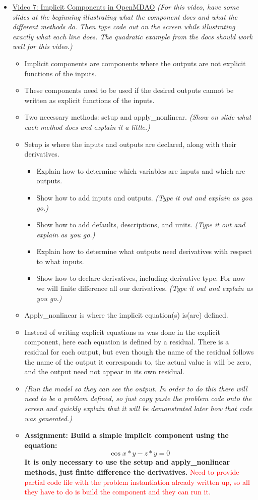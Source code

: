 \documentclass[12pt, letterpaper]{article}
\begin{document}
\begin{itemize}
	\item \underline{Video 7: Implicit Components in OpenMDAO} \textit{(For this video, have some slides at the beginning illustrating what the 				component does and what the different methods do. Then type code out on the screen while illustrating exactly what each line does. The 					quadratic example from the docs should work well for this video.)}
		\begin{itemize}
			\item Implicit components are components where the outputs are not explicit functions of the inputs.
			\item These components need to be used if the desired outputs cannot be written as explicit functions of the inputs.
			\item Two necessary methods: setup and apply\_nonlinear. \textit{(Show on slide what each method does and explain it a little.)}
			\item Setup is where the inputs and outputs are declared, along with their derivatives.
				\begin{itemize}
					\item Explain how to determine which variables are inputs and which are outputs.
					\item Show how to add inputs and outputs. \textit{(Type it out and explain as you go.)}
					\item Show how to add defaults, descriptions, and units. \textit{(Type it out and explain as you go.)}
					\item Explain how to determine what outputs need derivatives with respect to what inputs.
					\item Show how to declare derivatives, including derivative type. For now we will finite difference all our derivatives. \textit{(Type it out and explain as you go.)}
				\end{itemize}
			\item Apply\_nonlinear is where the implicit equation(s) is(are) defined. 
			\item Instead of writing explicit equations as was done in the explicit component, here each equation is defined by a residual. There is a 					residual for each output, but even though the name of the residual follows the name of the output it corresponds to, the actual value is will be zero, and the output need not appear in its own residual.
			\item \textit{(Run the model so they can see the output. In order to do this there will need to be a problem defined, so just copy paste the 				problem code onto the screen and quickly explain that it will be demonstrated later how that code was generated.)}
			\item \textbf{Assignment: Build a simple implicit component using the equation: $$ \cos{x*y}-z*y=0 $$ It is only necessary to use the setup 			and apply\_nonlinear methods, just finite difference the derivatives.} \textcolor{red}{Need to provide partial code file with the problem instantiation already written up, so all they have to do is build the component and they can run it.}
		\end{itemize}


\end{itemize}
\end{document}
